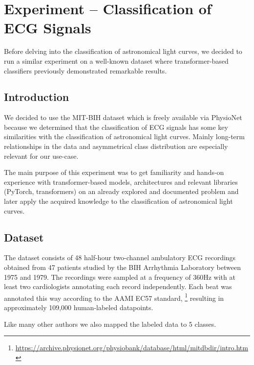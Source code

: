 \chapter{Experiment -- Classification of ECG Signals}

Before delving into the classification of astronomical light curves, we decided to run a similar experiment on a well-known dataset where transformer-based classifiers previously demonstrated remarkable results.  \parencite{Hu2022,ECGformer}


\section{Introduction}\label{sec:04_cntroduction}

We decided to use the MIT-BIH dataset \parencite{MIT-BIH} which is freely available via PhysioNet \parencite{PhysioNet} because we determined that the classification of ECG signals has some key similarities with the classification of astronomical light curves.
Mainly long-term relationships in the data and asymmetrical class distribution are especially relevant for our use-case.

The main purpose of this experiment was to get familiarity and hands-on experience with transformer-based models, architectures and relevant libraries (PyTorch, transformers) on an already explored and documented problem and later apply the acquired knowledge to the classification of astronomical light curves.


\section{Dataset}\label{sec:04_dataset}

The dataset consists of 48 half-hour two-channel ambulatory ECG recordings obtained from 47 patients studied by the BIH Arrhythmia Laboratory between 1975 and 1979.
The recordings were sampled at a frequency of 360Hz with at least two cardiologists annotating each record independently.
Each beat was annotated this way according to the AAMI EC57 standard, \footnote{\url{https://archive.physionet.org/physiobank/database/html/mitdbdir/intro.htm}} resulting in approximately 109,000 human-labeled datapoints. \parencite{MIT-BIH}

Like many other authors \parencite{Hu2022,ECG-CNN,ECGformer} we also mapped the labeled data to 5 classes.


